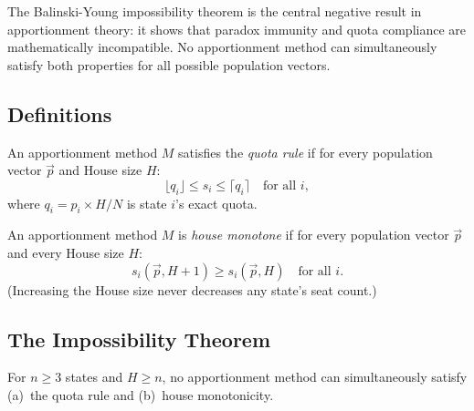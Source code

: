\label{sec:balinski-young}

The Balinski-Young impossibility theorem is the central negative result
in apportionment theory: it shows that paradox immunity and quota
compliance are mathematically incompatible.
No apportionment method can simultaneously satisfy both properties
for all possible population vectors.

\subsection{Definitions}

\begin{definition}
  An apportionment method $M$ satisfies the \emph{quota rule} if for
  every population vector $\vec{p}$ and House size $H$:
  \[
    \lfloor q_i \rfloor \leq s_i \leq \lceil q_i \rceil
    \quad \text{for all } i,
  \]
  where $q_i = p_i \times H / N$ is state $i$'s exact quota.
\end{definition}

\begin{definition}
  An apportionment method $M$ is \emph{house monotone} if for
  every population vector $\vec{p}$ and every House size $H$:
  \[
    s_i(\vec{p}, H+1) \geq s_i(\vec{p}, H) \quad \text{for all } i.
  \]
  (Increasing the House size never decreases any state's seat count.)
\end{definition}

\subsection{The Impossibility Theorem}

\begin{theorem}
  \label{thm:by-impossibility}
  For $n \geq 3$ states and $H \geq n$, no apportionment method can
  simultaneously satisfy (a)~the quota rule and (b)~house monotonicity.
\end{theorem}

